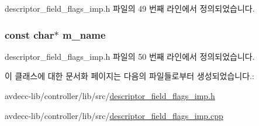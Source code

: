 descriptor\+\_\+field\+\_\+flags\+\_\+imp.\+h 파일의 49 번째 라인에서 정의되었습니다.

\subsubsection[{\texorpdfstring{m\+\_\+name}{m_name}}]{\setlength{\rightskip}{0pt plus 5cm}const char$\ast$ m\+\_\+name\hspace{0.3cm}{\ttfamily [private]}}\hypertarget{classavdecc__lib_1_1descriptor__field__flags__imp_aabec0ab061a518c77ba7c2925ad46d44}{}\label{classavdecc__lib_1_1descriptor__field__flags__imp_aabec0ab061a518c77ba7c2925ad46d44}


descriptor\+\_\+field\+\_\+flags\+\_\+imp.\+h 파일의 50 번째 라인에서 정의되었습니다.



이 클래스에 대한 문서화 페이지는 다음의 파일들로부터 생성되었습니다.\+:\begin{DoxyCompactItemize}
\item 
avdecc-\/lib/controller/lib/src/\hyperlink{descriptor__field__flags__imp_8h}{descriptor\+\_\+field\+\_\+flags\+\_\+imp.\+h}\item 
avdecc-\/lib/controller/lib/src/\hyperlink{descriptor__field__flags__imp_8cpp}{descriptor\+\_\+field\+\_\+flags\+\_\+imp.\+cpp}\end{DoxyCompactItemize}
